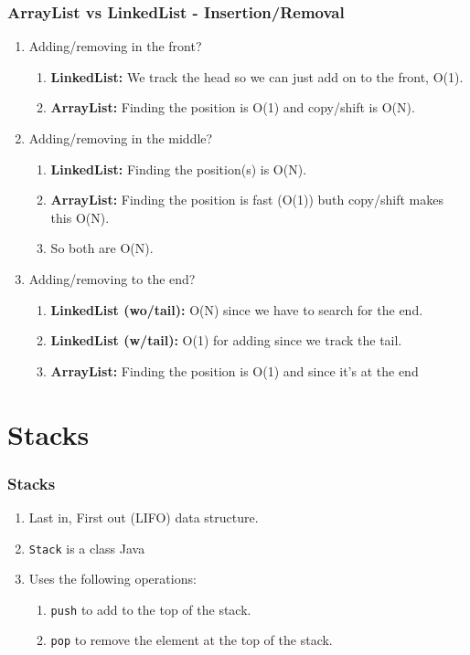 \documentclass{beamer}
\begin{document}
\begin{frame}
    \frametitle{ArrayList vs LinkedList - Insertion/Removal}
    \begin{enumerate}
        \item Adding/removing in the front?
            \pause
        \begin{enumerate}
            \item \textbf{LinkedList:} We track the head so we can just add on to the front, O(1).
            \item \textbf{ArrayList:} Finding the position is O(1) and copy/shift is O(N).
        \end{enumerate}
            \pause
        \item Adding/removing in the middle?
            \pause
        \begin{enumerate}
            \item \textbf{LinkedList:} Finding the position(s) is O(N).
            \item \textbf{ArrayList:} Finding the position is fast (O(1)) buth copy/shift makes this O(N).
            \item So both are O(N).
        \end{enumerate}
            \pause
        \item Adding/removing to the end?
            \pause
        \begin{enumerate}
            \item \textbf{LinkedList (wo/tail):} O(N) since we have to search for the end.
            \item \textbf{LinkedList (w/tail):} O(1) for adding since we track the tail.
            \item \textbf{ArrayList:} Finding the position is O(1) and since it's at the end 
        \end{enumerate}
    \end{enumerate}
\end{frame}


\section{Stacks}
\begin{frame}
    \frametitle{Stacks}
    \begin{enumerate}
        \item Last in, First out (LIFO) data structure.
        \item \lstinline|Stack| is a class Java
        \item Uses the following operations:
        \begin{enumerate}
            \item \lstinline|push| to add to the top of the stack.
            \item \lstinline|pop| to remove the element at the top of the stack.
        \end{enumerate}
    \end{enumerate}
\end{frame}
\end{document}
